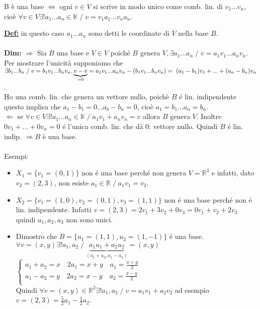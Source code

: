 \documentclass[12pt]{article}
\begin{document}
\begin{theorem} B è una base $\iff$ ogni $v \in V$ si scrive in modo unico come comb. lin. di $v_1...v_n$, cioè $\forall v \in V \exists! a_1...a_n \in \mathbb{K} \;/\; v = v_1a_1...v_na_n$.
\label{teorema basi}
\end{theorem}
\noindent \textbf{\underline{Def:}} in questo caso $a_1...a_n$ sono detti le coordinate di $V$ nella base $B$.\\\\
\textbf{Dim:} $\boldsymbol{\Longrightarrow} $ Sia $B$ una base e $V \in V$ poiché $B$ genera $V, \exists a_1...a_n\;/\; v=a_1v_1...a_nv_n$. Per mostrare l'unicità supponiamo che $\exists b_1...b_n \;/\; v=b_1v_1...b_nv_n.\\ 
\underbrace{v-v}_{=0} = a_1v_1...a_nv_n - (b_1v_1...b_nv_n) = \; (a_1-b_1)v_1+...+(a_n-b_n)v_n$.\\
Ho una comb. lin. che genera un vettore nullo, poichè $B$ é lin. indipendente questo implica che $a_1-b_1=0...a_b-b_n=0$, cioè $a_1 = b_1... a_n=b_n$.\\
$\boldsymbol{\Longleftarrow}$ se $\forall v\in V \exists! a_1...a_n \in \mathbb{K} \;/\; a_1v_1+a_nv_n = v$ allora $B$ genera $V$. Inoltre $0v_1+...+0v_n = 0$ é l'unica comb. lin. che dà 0: vettore nullo. Quindi $B$ é lin. indip. $\Rightarrow B$ è una base.\\\\
Esempi:
\begin{itemize}
    \item $X_1 = \{v_1 = (0,1)\}$ non é una base perché non genera $V = \mathbb{R}^3$ e infatti, dato $v_2 = (2,3)$, non esiste $a_1\in \mathbb{R} \;/\; a_1v_1=v_2$.
    \item $X_2 = \{v_1=(1,0), v_2 = (0,1), v_3=(1,1)\}$ non é una base perché non é lin. indipendente. Infatti $v = (2,3) = 2v_1 + 3v_2 + 0v_3 = 0v_1 + v_2 + 2v_3$ quindi $a_1,a_2,a_3$ non sono unici.
    \item Dimostro che $B = \{u_1 = (1,1), u_2 = (1,-1)\}$ é una base.\\
    $\forall v = (x,y) \exists! a_1,a_2 \;/\; \underbrace{a_1u_1 + a_2u_2}_{(a_1+a_2,a_1-a_2)} = (x,y)$\\
    $
    \begin{cases}
        a_1 + a_2 = x\quad 2a_1 = x+y\quad a_1 = \frac{x+y}{2}\\ 
        a_1 - a_2 = y\quad 2a_2 = x-y\quad a_2 = \frac{x-y}{2}\\
    \end{cases}$\\
    Quindi $\forall v=(x,y) \in \mathbb{R}^2 \exists! a_1,a_2 \;/\; v = a_1v_1+a_2v_2$ ad esempio $v = (2,3) = \frac{5}{2}a_1 - \frac{1}{2}a_2$.
\end{itemize}
\end{document}
